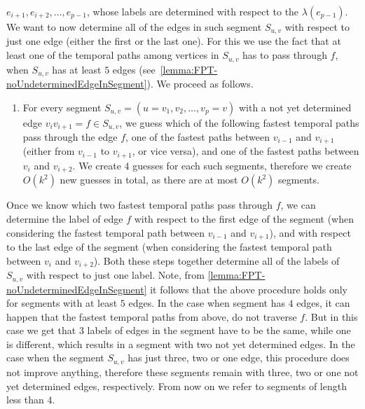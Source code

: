 \documentclass[11pt,a4paper]{article}
\theoremstyle{remark}
\theoremstyle{definition}
\newcounter{guesscounter}
\begin{document}
$e_{i+1}, e_{i+2}, \dots, e_{p-1}$, whose labels are determined with respect to the $\lambda(e_{p-1})$.
We want to now determine all of the edges in such segment $S_{u,v}$ with respect to just one edge (either the first or the last one).
For this we use the fact that at least one of the temporal paths among vertices in $S_{u,v}$ has to pass through $f$, when $S_{u,v}$ has at least $5$ edges (see~\cref{lemma:FPT-noUndeterminedEdgeInSegment}).
We proceed as follows.
\begin{enumerate}[G-1.]
    \setcounter{enumi}{\value{guesscounter}}
    \item \label{FPT-guessFTPinSegmentTgroughEdge}
    For every segment $S_{u,v} = (u=v_1, v_2, \dots, v_p=v)$  with a not yet determined edge $v_i v_{i+1} = f \in S_{u,v}$,
    we guess which of the following fastest temporal paths pass through the edge $f$,
    one of the fastest paths between $v_{i-1}$ and $v_{i+1}$ (either from $v_{i-1}$ to $v_{i+1}$, or vice versa), 
    and 
    one of the fastest paths between $v_{i}$ and $v_{i+2}$.
    We create $4$ guesses for each such segments, therefore we create $O(k^2)$ new guesses in total, as there are at most $O(k^2)$ segments.
    \setcounter{guesscounter}{\value{enumi}}
\end{enumerate}
Once we know which two fastest temporal paths pass through $f$, 
we can determine the label of edge $f$ 
with respect to the first edge of the segment (when considering the fastest temporal path between $v_{i-1}$ and $v_{i+1}$),
and with respect to the last edge of the segment (when considering the fastest temporal path between $v_{i}$ and $v_{i+2}$).
Both these steps together determine all of the labels of $S_{u,v}$ with respect to just one label.
Note, from \cref{lemma:FPT-noUndeterminedEdgeInSegment} it follows that the above procedure holds only for segments with at least $5$ edges.
In the case when segment has $4$ edges, it can happen that the fastest temporal paths from above, do not traverse $f$. But in this case we get that $3$ labels of edges in the segment have to be the same, while one is different,
which results in a segment with two not yet determined edges.
In the case when the segment $S_{u,v}$ has just three, two or one edge, this procedure does not improve anything,
therefore these segments remain with three, two or one not yet determined edges, respectively.
From now on we refer to segments of length less than $4$.
\end{document}
